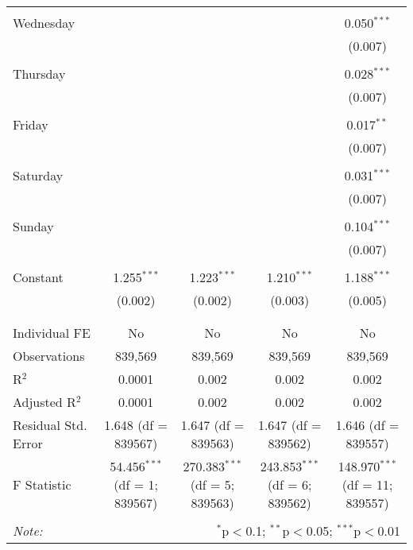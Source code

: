 \documentclass[
]{article}
\begin{document}
\begin{table}[!htbp]
{\begin{tabular}{@{\extracolsep{5pt}}lcccc}
  & & & & \\ 
 Wednesday &  &  &  & 0.050$^{***}$ \\ 
  &  &  &  & (0.007) \\ 
  & & & & \\ 
 Thursday &  &  &  & 0.028$^{***}$ \\ 
  &  &  &  & (0.007) \\ 
  & & & & \\ 
 Friday &  &  &  & 0.017$^{**}$ \\ 
  &  &  &  & (0.007) \\ 
  & & & & \\ 
 Saturday &  &  &  & 0.031$^{***}$ \\ 
  &  &  &  & (0.007) \\ 
  & & & & \\ 
 Sunday &  &  &  & 0.104$^{***}$ \\ 
  &  &  &  & (0.007) \\ 
  & & & & \\ 
 Constant & 1.255$^{***}$ & 1.223$^{***}$ & 1.210$^{***}$ & 1.188$^{***}$ \\ 
  & (0.002) & (0.002) & (0.003) & (0.005) \\ 
  & & & & \\ 
\hline \\[-1.8ex] 
Individual FE & No & No & No & No \\ 
Observations & 839,569 & 839,569 & 839,569 & 839,569 \\ 
R$^{2}$ & 0.0001 & 0.002 & 0.002 & 0.002 \\ 
Adjusted R$^{2}$ & 0.0001 & 0.002 & 0.002 & 0.002 \\ 
Residual Std. Error & 1.648 (df = 839567) & 1.647 (df = 839563) & 1.647 (df = 839562) & 1.646 (df = 839557) \\ 
F Statistic & 54.456$^{***}$ (df = 1; 839567) & 270.383$^{***}$ (df = 5; 839563) & 243.853$^{***}$ (df = 6; 839562) & 148.970$^{***}$ (df = 11; 839557) \\ 
\hline 
\hline \\[-1.8ex] 
\textit{Note:}  & \multicolumn{4}{r}{$^{*}$p$<$0.1; $^{**}$p$<$0.05; $^{***}$p$<$0.01} \\ 
\end{tabular}
} 
\end{table} 
\newpage
\end{document}
